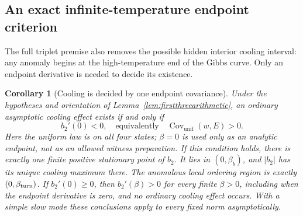 \documentclass[11pt]{article}
\newtheorem{corollary}{Corollary}
\begin{document}
\subsection{An exact infinite-temperature endpoint criterion}
\label{sec:tripletendpoint}
The full triplet premise also removes the possible hidden interior cooling
interval: any anomaly begins at the high-temperature end of the Gibbs curve.
Only an endpoint derivative is needed to decide its existence.

\begin{corollary}[Cooling is decided by one endpoint covariance]
\label{cor:tripletendpoint}
Under the hypotheses and orientation of
Lemma~\ref{lem:firstthreearithmetic}, an ordinary asymptotic cooling effect
exists if and only if
\[
b_2'(0)<0,
\quad\text{equivalently}\quad
\operatorname{Cov}_{\mathrm{unif}}(w,E)>0.
\]
Here the uniform law is on all four states; $\beta=0$ is used only as an
analytic endpoint, not as an allowed witness preparation. If this condition
holds, there is exactly one finite positive stationary point of $b_2$.
It lies in $(0,\beta_b)$, and $|b_2|$ has its unique cooling maximum there.
The anomalous local ordering region is exactly $(0,\beta_{\rm turn})$.
If $b_2'(0)\geq0$, then $b_2'(\beta)>0$ for every finite $\beta>0$,
including when the endpoint derivative is zero, and no ordinary cooling
effect occurs. With a simple slow mode these conclusions apply to every
fixed norm asymptotically.
\end{corollary}
\end{document}
